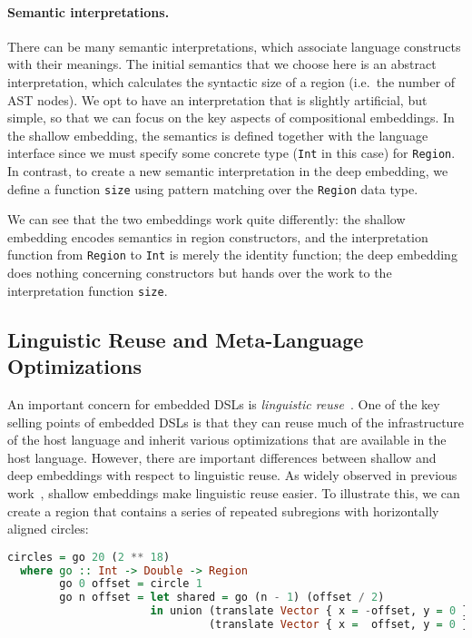 \paragraph{Semantic interpretations.}
There can be many semantic interpretations, which associate language constructs
with their meanings. The initial semantics that we choose here is an abstract
interpretation, which calculates the syntactic size of a region (i.e.~the number
of AST nodes). We opt to have an interpretation that is slightly artificial, but
simple, so that we can focus on the key aspects of compositional embeddings. In
the shallow embedding, the semantics is defined together with the language
interface since we must specify some concrete type (\lstinline{Int} in this
case) for \lstinline{Region}. In contrast, to create a new semantic
interpretation in the deep embedding, we define a function \lstinline{size}
using pattern matching over the \lstinline{Region} data type. 

We can see that the two embeddings work quite differently: the shallow embedding
encodes semantics in region constructors, and the interpretation function from
\lstinline{Region} to \lstinline{Int} is merely the identity function; the deep
embedding does nothing concerning constructors but hands over the work to the
interpretation function \lstinline{size}.

\subsection{Linguistic Reuse and Meta-Language Optimizations} \label{sec:meta}

An important concern for embedded DSLs is \emph{linguistic
reuse}~\citep{krishnamurthi2001linguistic}. One of the key selling points of
embedded DSLs is that they can reuse much of the infrastructure of the host
language and inherit various optimizations that are available in the host
language. However, there are important differences between shallow and deep
embeddings with respect to linguistic reuse. As widely observed in previous
work~\citep{rompf2012scala,jovanovic2014yinyang,svenningsson2015combining},
shallow embeddings make linguistic reuse easier. To illustrate this, we can
create a region that contains a series of repeated subregions with horizontally
aligned circles:

\begin{lstlisting}[language=Haskell,deletekeywords={union,intersect}]
circles = go 20 (2 ** 18)
  where go :: Int -> Double -> Region
        go 0 offset = circle 1
        go n offset = let shared = go (n - 1) (offset / 2)
                      in union (translate Vector { x = -offset, y = 0 } shared)
                               (translate Vector { x =  offset, y = 0 } shared)
\end{lstlisting}

